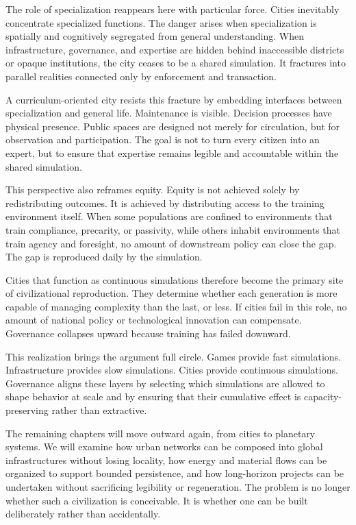 \documentclass[12pt,oneside]{book}
\begin{document}
The role of specialization reappears here with particular force. Cities inevitably concentrate specialized functions. The danger arises when specialization is spatially and cognitively segregated from general understanding. When infrastructure, governance, and expertise are hidden behind inaccessible districts or opaque institutions, the city ceases to be a shared simulation. It fractures into parallel realities connected only by enforcement and transaction.

A curriculum-oriented city resists this fracture by embedding interfaces between specialization and general life. Maintenance is visible. Decision processes have physical presence. Public spaces are designed not merely for circulation, but for observation and participation. The goal is not to turn every citizen into an expert, but to ensure that expertise remains legible and accountable within the shared simulation.

This perspective also reframes equity. Equity is not achieved solely by redistributing outcomes. It is achieved by distributing access to the training environment itself. When some populations are confined to environments that train compliance, precarity, or passivity, while others inhabit environments that train agency and foresight, no amount of downstream policy can close the gap. The gap is reproduced daily by the simulation.

Cities that function as continuous simulations therefore become the primary site of civilizational reproduction. They determine whether each generation is more capable of managing complexity than the last, or less. If cities fail in this role, no amount of national policy or technological innovation can compensate. Governance collapses upward because training has failed downward.

This realization brings the argument full circle. Games provide fast simulations. Infrastructure provides slow simulations. Cities provide continuous simulations. Governance aligns these layers by selecting which simulations are allowed to shape behavior at scale and by ensuring that their cumulative effect is capacity-preserving rather than extractive.

The remaining chapters will move outward again, from cities to planetary systems. We will examine how urban networks can be composed into global infrastructures without losing locality, how energy and material flows can be organized to support bounded persistence, and how long-horizon projects can be undertaken without sacrificing legibility or regeneration. The problem is no longer whether such a civilization is conceivable. It is whether one can be built deliberately rather than accidentally.
\end{document}
